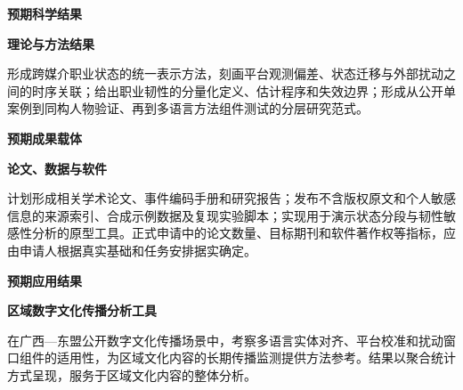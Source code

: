 \GXNSFBodyText

\noindent\textbf{预期科学结果}\par

\noindent\textbf{理论与方法结果}\par
形成跨媒介职业状态的统一表示方法，刻画平台观测偏差、状态迁移与外部扰动之间的时序关联；给出职业韧性的分量化定义、估计程序和失效边界；形成从公开单案例到同构人物验证、再到多语言方法组件测试的分层研究范式。

\noindent\textbf{预期成果载体}\par

\noindent\textbf{论文、数据与软件}\par
计划形成相关学术论文、事件编码手册和研究报告；发布不含版权原文和个人敏感信息的来源索引、合成示例数据及复现实验脚本；实现用于演示状态分段与韧性敏感性分析的原型工具。正式申请中的论文数量、目标期刊和软件著作权等指标，应由申请人根据真实基础和任务安排据实确定。

\noindent\textbf{预期应用结果}\par

\noindent\textbf{区域数字文化传播分析工具}\par
在广西—东盟公开数字文化传播场景中，考察多语言实体对齐、平台校准和扰动窗口组件的适用性，为区域文化内容的长期传播监测提供方法参考。结果以聚合统计方式呈现，服务于区域文化内容的整体分析。
